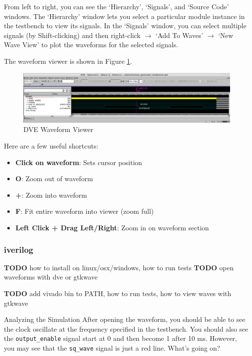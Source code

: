 \documentclass[11pt]{article}
\makeatletter
\renewcommand{\subsection}
{\@startsection {subsection}{1}{0pt}
 {-1ex}
 {0.5ex}
 {\bfseries\normalsize}}
\makeatother
\begin{document}
From left to right, you can see the `Hierarchy', `Signals', and `Source Code' windows.
The `Hierarchy' window lets you select a particular module instance in the testbench to view its signals.
In the `Signals' window, you can select multiple signals (by Shift-clicking) and then right-click $\rightarrow$ `Add To Waves' $\rightarrow$ `New Wave View' to plot the waveforms for the selected signals.

The waveform viewer is shown in Figure \ref{fig:dve_wave}.
\begin{figure}[h]
  \centering
  \includegraphics[width=\textwidth]{figs/dve_wave.png}
  \caption{DVE Waveform Viewer}
  \label{fig:dve_wave}
\end{figure}

Here are a few useful shortcuts:
\begin{itemize}
  \item \textbf{Click on waveform}: Sets cursor position
  \item \textbf{O}: Zoom out of waveform
  \item \textbf{+}: Zoom into waveform
  \item \textbf{F}: Fit entire waveform into viewer (zoom full)
  \item \textbf{Left Click + Drag Left/Right}: Zoom in on waveform section
\end{itemize}

\subsubsection{iverilog}
\textbf{TODO} how to install on linux/osx/windows, how to run tests
\textbf{TODO} open waveforms with dve or gtkwave

\textbf{TODO} add vivado bin to PATH, how to run tests, how to view waves with gtkwave

\subsection{Analyzing the Simulation}
After opening the waveform, you should be able to see the clock oscillate at the frequency specified in the testbench.
You should also see the \verb|output_enable| signal start at 0 and then become 1 after 10 ms.
However, you may see that the \verb|sq_wave| signal is just a red line. What's going on?
\end{document}
